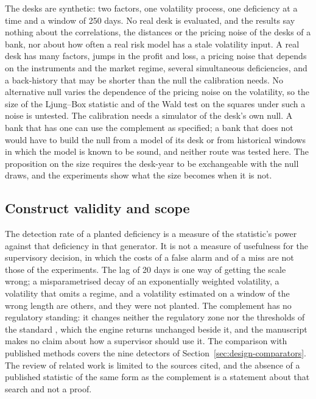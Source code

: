 The desks are synthetic: two factors, one volatility process, one deficiency at a time and a window of 250 days.
No real desk is evaluated, and the results say nothing about the correlations, the distances or the pricing noise of the desks of a bank, nor about how often a real risk model has a stale volatility input.
A real desk has many factors, jumps in the profit and loss, a pricing noise that depends on the instruments and the market regime, several simultaneous deficiencies, and a back-history that may be shorter than the null the calibration needs.
No alternative null varies the dependence of the pricing noise on the volatility, so the size of the Ljung--Box statistic and of the Wald test on the squares under such a noise is untested.
The calibration needs a simulator of the desk's own null.
A bank that has one can use the complement as specified; a bank that does not would have to build the null from a model of its desk or from historical windows in which the model is known to be sound, and neither route was tested here.
The proposition on the size requires the desk-year to be exchangeable with the null draws, and the experiments show what the size becomes when it is not.

\subsection{Construct validity and scope}
\label{sec:limits-construct}

The detection rate of a planted deficiency is a measure of the statistic's power against that deficiency in that generator.
It is not a measure of usefulness for the supervisory decision, in which the costs of a false alarm and of a miss are not those of the experiments.
The lag of 20 days is one way of getting the scale wrong; a misparametrised decay of an exponentially weighted volatility, a volatility that omits a regime, and a volatility estimated on a window of the wrong length are others, and they were not planted.
The complement has no regulatory standing: it changes neither the regulatory zone nor the thresholds of the standard \citep{bcbs2019}, which the engine returns unchanged beside it, and the manuscript makes no claim about how a supervisor should use it.
The comparison with published methods covers the nine detectors of Section~\ref{sec:design-comparators}.
The review of related work is limited to the sources cited, and the absence of a published statistic of the same form as the complement is a statement about that search and not a proof.
